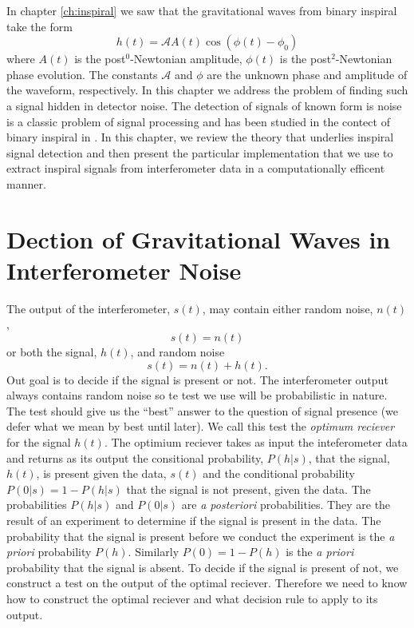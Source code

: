 
In chapter \ref{ch:inspiral} we saw that the gravitational waves from binary
inspiral take the form
\begin{equation}
h(t) = \mathcal{A} A(t) \cos\left( \phi(t) - \phi_0 \right)
\end{equation}
where $A(t)$ is the post$^{0}$-Newtonian amplitude, $\phi(t)$ is the
post$^2$-Newtonian phase evolution. The constants $\mathcal{A}$ and $\phi$ are
the unknown phase and amplitude of the waveform, respectively. In this chapter
we address the problem of finding such a signal hidden in detector noise. The
detection of signals of known form is noise is a classic problem of signal
processing\cite{wainstein:1962} and has been studied in the contect of binary
inspiral in \cite{Finn:1992wt,Finn:1992xs}. In this chapter, we review the
theory that underlies inspiral signal detection and then present the particular
implementation that we use to extract inspiral signals from interferometer
data in a computationally efficent manner.

\section{Dection of Gravitational Waves in Interferometer Noise}
\label{s:detectiontheory}

The output of the interferometer, $s(t)$, may contain either random noise,
$n(t)$,
\begin{equation}
s(t) = n(t)
\end{equation}
or both the signal, $h(t)$, and random noise
\begin{equation}
s(t) = n(t) + h(t).
\end{equation}
Out goal is to decide if the signal is present or not. The interferometer
output always contains random noise so te test we use will be probabilistic in
nature. The test should give us the ``best'' answer to the question of signal
presence (we defer what we mean by best until later). We call this test the
\emph{optimum reciever} for the signal $h(t)$. The optimium reciever takes as
input the inteferometer data and returns as its output the consitional
probability, $P(h|s)$, that the signal, $h(t)$, is present given the data,
$s(t)$ and the conditional probability $P(0|s) = 1 - P(h|s)$ that the signal
is not present, given the data. The probabilities $P(h|s)$ and $P(0|s)$ are
\emph{a posteriori} probabilities. They are the result of an experiment to
determine if the signal is present in the data. The probability that the
signal is present before we conduct the experiment is the \emph{a priori}
probability $P(h)$. Similarly $P(0) = 1 - P(h)$ is the \emph{a priori}
probability that the signal is absent. To decide if the signal is present of
not, we construct a test on the output of the optimal reciever. Therefore we
need to know how to construct the optimal reciever and what decision rule to
apply to its output.

